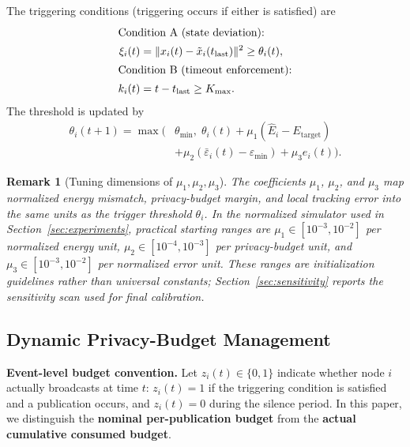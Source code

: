 \documentclass[10pt]{article}
\newtheorem{remark}{Remark}[section]
\begin{document}
The triggering conditions (triggering occurs if either is satisfied) are
\begin{align}
  \intertext{Condition A (state deviation):}
  \xi_i(t)&=\|x_i(t)-\tilde{x}_i(t_{\mathrm{last}})\|^2 \geq \theta_i(t),\label{eq:condA}\\
  \intertext{Condition B (timeout enforcement):}
  k_i(t)&=t-t_{\mathrm{last}} \geq K_{\max}.\label{eq:condB}
\end{align}
The threshold is updated by
\begin{equation}\label{eq:theta}
  \begin{aligned}
    \theta_i(t+1)=\max\!\bigl(&\theta_{\min},\;\theta_i(t)+\mu_1(\hat{E}_i-E_{\mathrm{target}})\\
    &+\mu_2(\bar{\varepsilon}_i(t)-\varepsilon_{\min})+\mu_3 e_i(t)\bigr).
  \end{aligned}
\end{equation}
\begin{remark}[Tuning dimensions of $\mu_1,\mu_2,\mu_3$]
  The coefficients $\mu_1$, $\mu_2$, and $\mu_3$ map normalized energy mismatch, privacy-budget margin, and local tracking error into the same units as the trigger threshold $\theta_i$. In the normalized simulator used in Section~\ref{sec:experiments}, practical starting ranges are $\mu_1\in[10^{-3},10^{-2}]$ per normalized energy unit, $\mu_2\in[10^{-4},10^{-3}]$ per privacy-budget unit, and $\mu_3\in[10^{-3},10^{-2}]$ per normalized error unit. These ranges are initialization guidelines rather than universal constants; Section~\ref{sec:sensitivity} reports the sensitivity scan used for final calibration.
\end{remark}

\subsection{Dynamic Privacy-Budget Management}\label{sec:budget_management}

\textbf{Event-level budget convention.} Let $z_i(t)\in\{0,1\}$ indicate whether node $i$ actually broadcasts at time $t$: $z_i(t)=1$ if the triggering condition is satisfied and a publication occurs, and $z_i(t)=0$ during the silence period. In this paper, we distinguish the \textbf{nominal per-publication budget} from the \textbf{actual cumulative consumed budget}.
\end{document}
